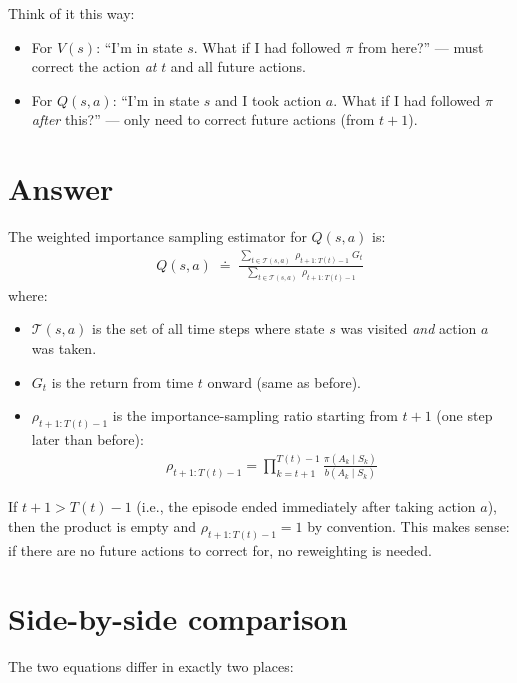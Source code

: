 \documentclass[11pt]{article}
\begin{document}
Think of it this way:
\begin{itemize}[nosep]
    \item For $V(s)$: ``I'm in state $s$. What if I had followed $\pi$ from here?'' --- must correct the action \textit{at} $t$ and all future actions.
    \item For $Q(s, a)$: ``I'm in state $s$ and I took action $a$. What if I had followed $\pi$ \textit{after} this?'' --- only need to correct future actions (from $t+1$).
\end{itemize}

\section*{Answer}

The weighted importance sampling estimator for $Q(s, a)$ is:
\begin{align}
    \boxed{Q(s, a) \;\doteq\; \frac{\displaystyle\sum_{t \in \mathcal{T}(s,a)}\; \rho_{t+1:T(t)-1}\; G_t}{\displaystyle\sum_{t \in \mathcal{T}(s,a)}\; \rho_{t+1:T(t)-1}}}
\end{align}
where:
\begin{itemize}[nosep]
    \item $\mathcal{T}(s, a)$ is the set of all time steps where state $s$ was visited \textit{and} action $a$ was taken.
    \item $G_t$ is the return from time $t$ onward (same as before).
    \item $\rho_{t+1:T(t)-1}$ is the importance-sampling ratio starting from $t+1$ (one step later than before):
    \begin{align}
        \rho_{t+1:T(t)-1} = \prod_{k=t+1}^{T(t)-1} \frac{\pi(A_k \mid S_k)}{b(A_k \mid S_k)}
    \end{align}
\end{itemize}

If $t+1 > T(t) - 1$ (i.e., the episode ended immediately after taking action $a$), then the product is empty and $\rho_{t+1:T(t)-1} = 1$ by convention. This makes sense: if there are no future actions to correct for, no reweighting is needed.

\section*{Side-by-side comparison}

The two equations differ in exactly two places:
\end{document}
